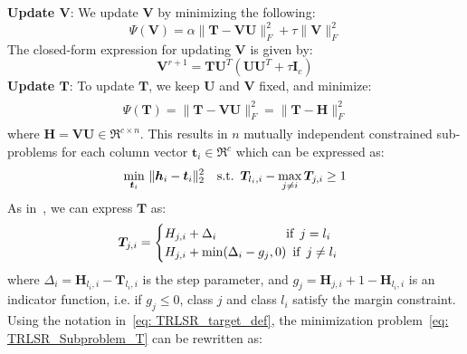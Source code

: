 \noindent\textbf{Update $\bm{V}$}: We update $\bm{V}$ by minimizing the following:
\begin{equation}
    \label{eq: TRLSR_Update_V}
    \Psi(\bm{V}) = \alpha \| \bm{T} - \bm{V} \bm{U} \|_{F}^{2} + \tau \| \bm{V} \|_{F}^{2}
\end{equation}
The closed-form expression for updating $\bm{V}$ is given by:
\begin{equation}
    \label{eq: TRLSR_Define_V}
    \bm{V}^{r+1} = \bm{T}\bm{U}^{T}(\bm{U}\bm{U}^{T} + \tau\bm{I}_{c} )
\end{equation}
%
\noindent\textbf{Update $\bm{T}$}: To update $\bm{T}$, we keep $\bm{U}$ and $\bm{V}$ fixed, and minimize:
%
\begin{align}
    \begin{split}
        \label{eq: TRLSR_Define_T}
        \Psi(\bm{T}) = \| \bm{T} - \bm{V} \bm{U} \|_{F}^{2} = \|\bm{T} - \bm{H} \|_{F}^{2}  
    \end{split}
\end{align}
%
where $\bm{H}=\bm{VU} \in \Re^{c \times n}$. This results in $n$ mutually independent constrained sub-problems for each column vector $\bm{t}_{i} \in \Re^{c}$ which can be expressed as:
%
\begin{align}
\begin{split}
    \label{eq: TRLSR_Subproblem_T}
    \min_{\bm{t}_{i}} \, \| \bm{h}_{i} - \bm{t}_{i} \|_{2}^{2} \quad \text{s.t.} \enskip \bm{T}_{l_{i},i} - \max_{j \neq i} \bm{T}_{j,i} \geq 1
\end{split}
\end{align}
%
As in~\cite{ReLSR}, we can express $\bm{T}$ as:
%
\begin{equation}
\label{eq: TRLSR_target_def}
   \bm{T}_{j,i} =
   \begin{cases}
H_{j,i} + \Delta_{i} \enskip \qquad \quad \qquad \text{if} \enskip j = l_{i}  \\
H_{j,i} + \min (\Delta_{i} - g_{j}, 0) \enskip \text{if} \enskip j \neq l_{i}
\end{cases}
\end{equation}
%
where $\Delta_{i} = \bm{H}_{l_{i},i} - \bm{T}_{l_{i},i}$ is the step parameter, and $g_{j} = \bm{H}_{j,i} + 1 - \bm{H}_{l_{i}, i}$ is an indicator function, i.e. if $g_{j} \leq 0$, class $j$ and class $l_{i}$  satisfy the margin constraint. Using the notation in~\eqref{eq: TRLSR_target_def}, the minimization problem~\eqref{eq: TRLSR_Subproblem_T} can be rewritten as:
